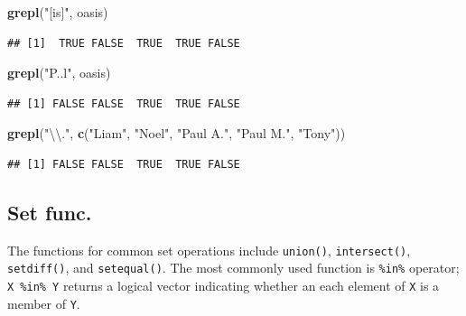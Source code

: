 \documentclass[]{book}
\newenvironment{Shaded}{\begin{snugshade}}{\end{snugshade}}
\newcommand{\KeywordTok}[1]{\textcolor[rgb]{0.13,0.29,0.53}{\textbf{{#1}}}}
\newcommand{\DecValTok}[1]{\textcolor[rgb]{0.00,0.00,0.81}{{#1}}}
\newcommand{\CharTok}[1]{\textcolor[rgb]{0.31,0.60,0.02}{{#1}}}
\newcommand{\StringTok}[1]{\textcolor[rgb]{0.31,0.60,0.02}{{#1}}}
\newcommand{\NormalTok}[1]{{#1}}
\theoremstyle{definition}
\theoremstyle{definition}
\theoremstyle{remark}
\begin{document}
\begin{Shaded}
\begin{Highlighting}[]
\KeywordTok{grepl}\NormalTok{(}\StringTok{"[is]"}\NormalTok{, oasis)}
\end{Highlighting}
\end{Shaded}

\begin{verbatim}
## [1]  TRUE FALSE  TRUE  TRUE FALSE
\end{verbatim}

\begin{Shaded}
\begin{Highlighting}[]
\KeywordTok{grepl}\NormalTok{(}\StringTok{"P..l"}\NormalTok{, oasis)}
\end{Highlighting}
\end{Shaded}

\begin{verbatim}
## [1] FALSE FALSE  TRUE  TRUE FALSE
\end{verbatim}

\begin{Shaded}
\begin{Highlighting}[]
\KeywordTok{grepl}\NormalTok{(}\StringTok{"}\CharTok{\textbackslash{}\textbackslash{}}\StringTok{."}\NormalTok{, }\KeywordTok{c}\NormalTok{(}\StringTok{"Liam"}\NormalTok{, }\StringTok{"Noel"}\NormalTok{, }\StringTok{"Paul A."}\NormalTok{, }\StringTok{"Paul M."}\NormalTok{, }\StringTok{"Tony"}\NormalTok{))}
\end{Highlighting}
\end{Shaded}

\begin{verbatim}
## [1] FALSE FALSE  TRUE  TRUE FALSE
\end{verbatim}

\subsection{Set func.}\label{set-func.}

The functions for common set operations include \texttt{union()},
\texttt{intersect()}, \texttt{setdiff()}, and \texttt{setequal()}. The
most commonly used function is \texttt{\%in\%} operator;
\texttt{X\ \%in\%\ Y} returns a logical vector indicating whether an
each element of \texttt{X} is a member of \texttt{Y}.

\begin{Shaded}
\end{Shaded}
\end{document}
